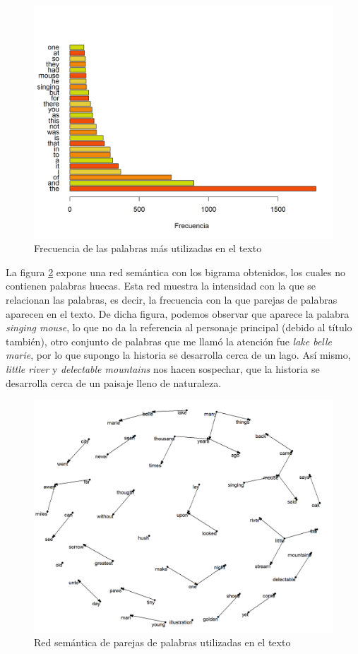 \documentclass[spanish,notitlepage,letterpaper, 12pt]{article} %
\begin{document}
\begin{figure}[]
\begin{center}
\includegraphics[width=16 cm]{FigModeloReporte/T2_palabras.png}
\caption{Frecuencia de las palabras más utilizadas en el texto}\label{f2}
\end{center}
\end{figure}

La figura \ref{f3} expone una red semántica con los bigrama obtenidos, los cuales no contienen palabras huecas. Esta red muestra la intensidad con la que se relacionan las palabras, es decir, la frecuencia con la que parejas de palabras aparecen en el texto. De dicha figura, podemos observar que aparece la palabra \emph{singing mouse}, lo que no da la referencia al personaje principal (debido al título también), otro conjunto de palabras que me llamó la atención fue \emph{lake belle marie}, por lo que supongo la historia se desarrolla cerca de un lago. Así mismo, \emph{little river} y \emph{delectable mountains} nos hacen sospechar, que la historia se desarrolla cerca de un paisaje lleno de naturaleza.

\begin{figure}[]
\begin{center}
\includegraphics[width=16 cm]{FigModeloReporte/T2_bigrama.png}
\caption{Red semántica de parejas de palabras utilizadas en el texto}\label{f3}
\end{center}
\end{figure}



\end{document}
